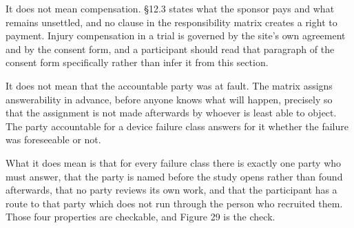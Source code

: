 It does not mean compensation. \S 12.3 states what the sponsor pays and what
remains unsettled, and no clause in the responsibility matrix creates a right to
payment. Injury compensation in a trial is governed by the site's own agreement
and by the consent form, and a participant should read that paragraph of the
consent form specifically rather than infer it from this section.

It does not mean that the accountable party was at fault. The matrix assigns
answerability in advance, before anyone knows what will happen, precisely so
that the assignment is not made afterwards by whoever is least able to object.
The party accountable for a device failure class answers for it whether the
failure was foreseeable or not.

What it does mean is that for every failure class there is exactly one party who
must answer, that the party is named before the study opens rather than found
afterwards, that no party reviews its own work, and that the participant has a
route to that party which does not run through the person who recruited them.
Those four properties are checkable, and Figure 29 is the check.
